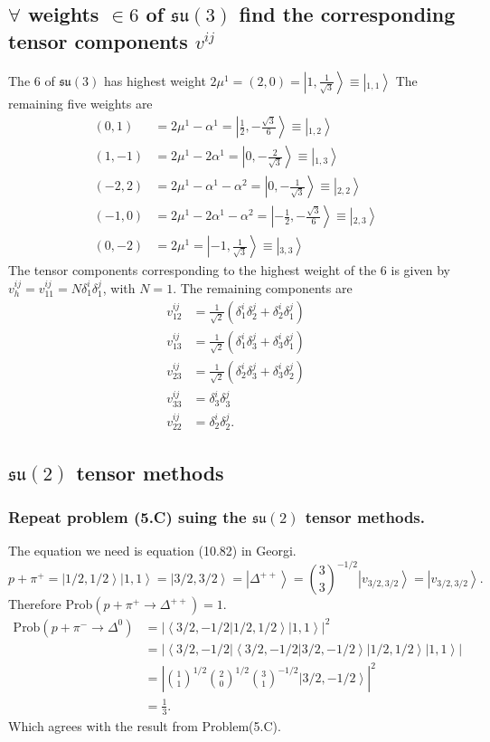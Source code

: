 \documentclass[main.tex]{subfiles}
\begin{document}
\subsection{$\forall$ weights $\in6$ of $\mathfrak{su}(3)$ find the corresponding tensor components $v^{ij}$}
The $6$ of $\mathfrak{su}(3)$ has highest weight $2\mu^1=(2,0)=\left|1,\frac{1}{\sqrt{3}}\right>\equiv\left|_{1,1}\right>$
The remaining five weights are
\begin{align}
(0,1)&=2\mu^1-\alpha^1=\left|\frac{1}{2},-\frac{\sqrt{3}}{6}\right>\equiv\left|_{1,2}\right>\\
(1,-1)&=2\mu^1-2\alpha^1=\left|0,-\frac{2}{\sqrt{3}}\right>\equiv\left|_{1,3}\right>\\
(-2,2)&=2\mu^1-\alpha^1-\alpha^2=\left|0,-\frac{1}{\sqrt{3}}\right>\equiv\left|_{2,2}\right>\\
(-1,0)&=2\mu^1-2\alpha^1-\alpha^2=\left|-\frac{1}{2},-\frac{\sqrt{3}}{6}\right>\equiv\left|_{2,3}\right>\\
(0,-2)&=2\mu^1=\left|-1,\frac{1}{\sqrt{3}}\right>\equiv\left|_{3,3}\right>
\end{align}
The tensor components corresponding to the highest weight of the $6$ is given by $v_{h}^{ij}=v^{ij}_{11}=N\delta_1^i\delta^j_1$, with $N=1$. The remaining components are
\begin{align}
v_{12}^{ij}&=\frac{1}{\sqrt{2}}(\delta^i_1\delta^j_2+\delta_2^i\delta^j_1)\\
v_{13}^{ij}&=\frac{1}{\sqrt{2}}(\delta^i_1\delta^j_3+\delta_3^i\delta^j_1)\\
v_{23}^{ij}&=\frac{1}{\sqrt{2}}(\delta^i_2\delta^j_3+\delta_3^i\delta^j_2)\\
v_{33}^{ij}&=\delta^i_3\delta^j_3\\
v_{22}^{ij}&=\delta^i_2\delta^j_2.
\end{align}

\subsection{$\mathfrak{su}(2)$ tensor methods}
\subsubsection{Repeat problem (5.C) suing the $\mathfrak{su}(2)$ tensor methods.}
The equation we need is equation (10.82) in Georgi.
\begin{equation}
p+\pi^+=\left|1/2,1/2\right>\left|1,1\right>=\left|3/2,3/2\right>=\left|\Delta^{++}\right>={{3}\choose{3}}^{-1/2}\left|v_{3/2,3/2}\right>=\left|v_{3/2,3/2}\right>.
\end{equation}
Therefore Prob$(p+\pi^+\rightarrow\Delta^{++})=1$. 
\begin{align}
\text{Prob}(p+\pi^-\rightarrow\Delta^{0})&=|\left<3/2,-1/2|1/2,1/2\right>\left|1,1\right>|^2\\
&=|\left<3/2,-1/2\right|\left<3/2,-1/2|3/2,-1/2\right>\left|1/2,1/2\right>\left|1,1\right>|\\
&=\left|{{1}\choose{1}}^{1/2}{{2}\choose{0}}^{1/2}{{3}\choose{1}}^{-1/2}\left|3/2,-1/2\right>\right|^2\\
&=\frac{1}{3}.
\end{align}
Which agrees with the result from Problem(5.C).
\end{document}
